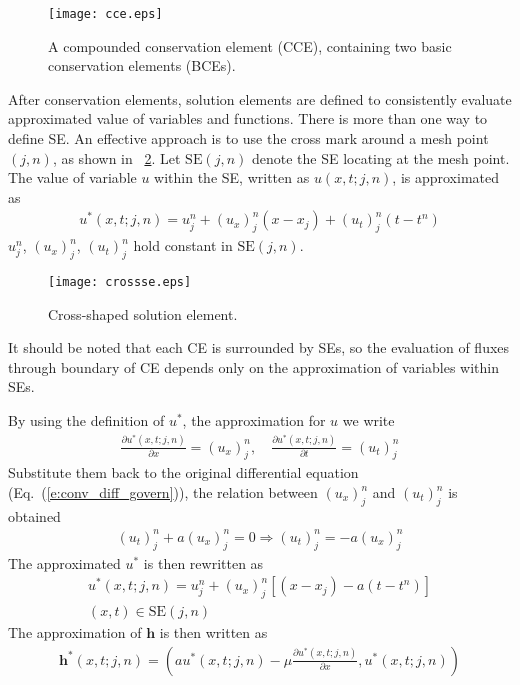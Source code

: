 \documentclass{turgon}
\begin{document}
\begin{figure}[htbp]
\centering
  \texttt{[image: cce.eps]}
  \caption{A compounded conservation element (CCE), containing two basic
  conservation elements (BCEs).}
  \label{f:cce}
\end{figure}

After conservation elements, solution elements are defined to consistently
evaluate approximated value of variables and functions.  There is more than one
way to define SE.  An effective approach is to use the cross mark around a mesh
point $(j,n)$, as shown in \figurename~\ref{f:crossse}.  Let $\mathrm{SE}(j,n)$
denote the SE locating at the mesh point.  The value of variable $u$ within the
SE, written as $u(x,t;j,n)$, is approximated as
\begin{align*}
  u^*(x,t;j,n) = u_j^n + (u_x)_j^n(x-x_j) + (u_t)_j^n(t-t^n)
\end{align*}
$u_j^n$, $(u_x)_j^n$, $(u_t)_j^n$ hold constant in $\mathrm{SE}(j,n)$.

\begin{figure}[hbtp]
  \centering
  \texttt{[image: crossse.eps]}
  \caption{Cross-shaped solution element.}
  \label{f:crossse}
\end{figure}

It should be noted that each CE is surrounded by SEs, so the evaluation of
fluxes through boundary of CE depends only on the approximation of variables
within SEs.

By using the definition of $u^*$, the approximation for $u$
we write
\begin{align*}
  \frac{\partial u^*(x,t;j,n)}{\partial x} = (u_x)_j^n, \quad
  \frac{\partial u^*(x,t;j,n)}{\partial t} = (u_t)_j^n
\end{align*}
Substitute them back to the original differential equation
(Eq.~(\ref{e:conv_diff_govern})), the relation between $(u_x)_j^n$ and
$(u_t)_j^n$ is obtained
\begin{align*}
              (u_t)_j^n + a(u_x)_j^n = 0
  \Rightarrow (u_t)_j^n = -a(u_x)_j^n
\end{align*}
The approximated $u^*$ is then rewritten as
\begin{gather*}
  u^*(x,t;j,n) = u_j^n + (u_x)_j^n[(x-x_j) - a(t-t^n)] \\
  (x,t) \in \mathrm{SE}(j,n)
\end{gather*}
The approximation of $\mathbf{h}$ is then written as
\begin{align*}
  \mathbf{h}^*(x,t;j,n) =
  \left(
    au^*(x,t;j,n)-\mu\frac{\partial u^*(x,t;j,n)}{\partial x}, u^*(x,t;j,n)
  \right)
\end{align*}
\end{document}
